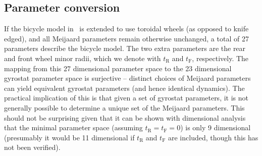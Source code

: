 \subsection{Parameter conversion}\label{model:parameter_conversion}
If the bicycle model in~\cite{Meijaard2007} is extended to use toroidal wheels
(as opposed to knife edged), and all Meijaard parameters remain otherwise
unchanged, a total of 27 parameters describe the bicycle model.  The two extra
parameters are the rear and front wheel minor radii, which we denote with
$t_\text{R}$ and $t_\text{F}$, respectively. The mapping from this 27
dimensional parameter space to the 23 dimensional gyrostat parameter space is
surjective -- distinct choices of Meijaard parameters can yield equivalent
gyrostat parameters (and hence identical dynamics). The practical implication
of this is that given a set of gyrostat parameters, it is not generally
possible to determine a unique set of the Meijaard parameters. This should not
be surprising given that it can be shown with dimensional analysis that the
minimal parameter space (assuming $t_\text{R}=t_\text{F}=0$) is only 9
dimensional~\cite{Sharp2008} (presumably it would be 11 dimensional if
$t_\text{R}$ and $t_\text{F}$ are included, though this has not been
verified).

